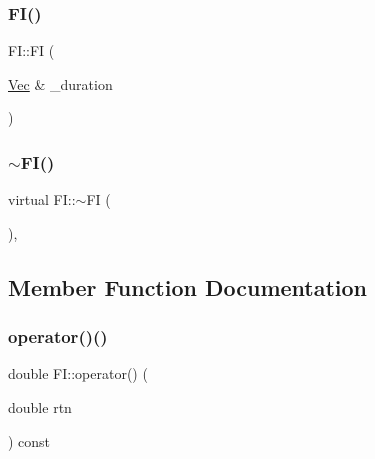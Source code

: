\hypertarget{classFI_a52951d4aeccbe628a59b65968713c85f}{}\label{classFI_a52951d4aeccbe628a59b65968713c85f} 
\subsubsection{\texorpdfstring{F\+I()}{FI()}\hspace{0.1cm}{\footnotesize\ttfamily [2/2]}}
{\footnotesize\ttfamily F\+I\+::\+FI (\begin{DoxyParamCaption}\item[{\hyperlink{compute__returns__eigen_8h_a1eb6a9306ef406d7975f3cbf2e247777}{Vec} \&}]{\+\_\+duration }\end{DoxyParamCaption})}

\hypertarget{classFI_a856ac31d9840ae7cd9eeba9482832f8a}{}\label{classFI_a856ac31d9840ae7cd9eeba9482832f8a} 
\subsubsection{\texorpdfstring{$\sim$\+F\+I()}{~FI()}}
{\footnotesize\ttfamily virtual F\+I\+::$\sim$\+FI (\begin{DoxyParamCaption}{ }\end{DoxyParamCaption})\hspace{0.3cm}{\ttfamily [inline]}, {\ttfamily [virtual]}}



\subsection{Member Function Documentation}
\hypertarget{classFI_a99ad4380e8178d7fd304597622a2c05c}{}\label{classFI_a99ad4380e8178d7fd304597622a2c05c} 
\subsubsection{\texorpdfstring{operator()()}{operator()()}\hspace{0.1cm}{\footnotesize\ttfamily [1/2]}}
{\footnotesize\ttfamily double F\+I\+::operator() (\begin{DoxyParamCaption}\item[{double}]{rtn }\end{DoxyParamCaption}) const\hspace{0.3cm}{\ttfamily [virtual]}}



